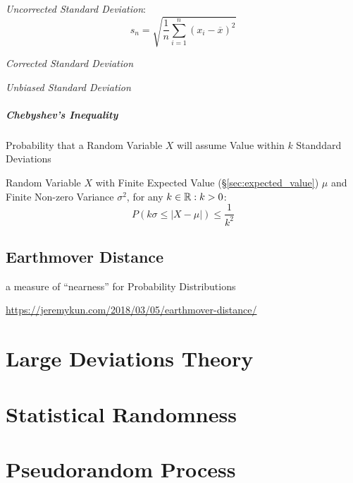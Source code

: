 \emph{Uncorrected Standard Deviation}:
\[
  s_n = \sqrt{\frac{1}{n}\sum_{i=1}^n (x_i - \overline{x})^2}
\]

\emph{Corrected Standard Deviation}

\emph{Unbiased Standard Deviation}



\subparagraph{Chebyshev's Inequality}\label{sec:chebyshevs_inequality}
\hfill

Probability that a Random Variable $X$ will assume Value within $k$
Standdard Deviations

Random Variable $X$ with Finite Expected Value
(\S\ref{sec:expected_value}) $\mu$ and Finite Non-zero Variance
$\sigma^2$, for any $k \in \mathbb{R} : k > 0$:
\[
  P(k\sigma \leq |X - \mu|) \leq \frac{1}{k^2}
\]



\subsection{Earthmover Distance}\label{sec:earthmover_distance}


a measure of ``nearness'' for Probability Distributions

\url{https://jeremykun.com/2018/03/05/earthmover-distance/}



\section{Large Deviations Theory}\label{sec:large_deviations_theory}

\section{Statistical Randomness}\label{sec:statistical_randomness}

\section{Pseudorandom Process}\label{sec:pseudorandom_process}

